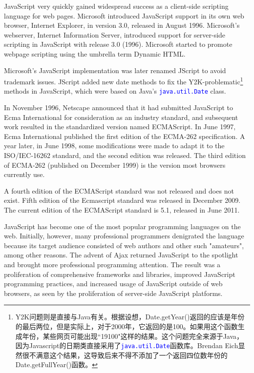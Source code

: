 JavaScript very quickly gained widespread success as a client-side scripting language for web pages. Microsoft introduced JavaScript support in its own web browser, Internet Explorer, in version 3.0, released in August 1996. Microsoft's webserver, Internet Information Server, introduced support for server-side scripting in JavaScript with release 3.0 (1996). Microsoft started to promote webpage scripting using the umbrella term Dynamic HTML.



Microsoft's JavaScript implementation was later renamed JScript to avoid trademark issues. JScript added new date methods to fix the Y2K-problematic\footnote{Y2K问题则是直接与Java有关。\newline 根据设想，\textsf{Date.getYear()}返回的应该是年份的最后两位，但是实际上，对于2000年，它返回的是100。如果用这个函数生成年份，某些网页可能出现``19100"这样的结果。\newline 这个问题完全来源于Java，因为Javascript的日期类直接采用了\textcolor{Blue}{\texttt{java.util.Date}}函数库。Brendan Eich显然很不满意这个结果，这导致后来不得不添加了一个返回四位数年份的\textsf{Date.getFullYear()}函数。} methods in JavaScript, which were based on Java's \textcolor{Blue}{\texttt{java.util.Date}} class.


In November 1996, Netscape announced that it had submitted JavaScript to Ecma International for consideration as an industry standard, and subsequent work resulted in the standardized version named ECMAScript. In June 1997, Ecma International published the first edition of the ECMA-262 specification. A year later, in June 1998, some modifications were made to adapt it to the ISO/IEC-16262 standard, and the second edition was released. The third edition of ECMA-262 (published on December 1999) is the version most browsers currently use.

A fourth edition of the ECMAScript standard was not released and does not exist. Fifth edition of the Ecmascript standard was released in December 2009. The current edition of the ECMAScript standard is 5.1, released in June 2011.

JavaScript has become one of the most popular programming languages on the web. Initially, however, many professional programmers denigrated the language because its target audience consisted of web authors and other such "amateurs", among other reasons. The advent of Ajax returned JavaScript to the spotlight and brought more professional programming attention. The result was a proliferation of comprehensive frameworks and libraries, improved JavaScript programming practices, and increased usage of JavaScript outside of web browsers, as seen by the proliferation of server-side JavaScript platforms.


